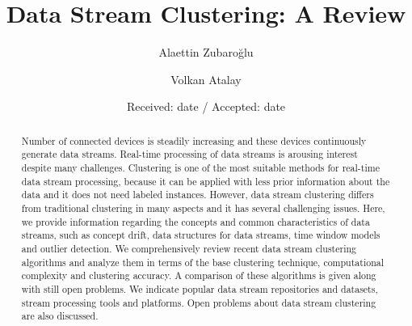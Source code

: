 \documentclass[smallcondensed]{svjour3}     %
\begin{document}
\title{Data Stream Clustering: A Review
}


\author{Alaettin Zubaro\u{g}lu      \and
        Volkan Atalay
}


\date{Received: date / Accepted: date}


\maketitle

\begin{abstract}
Number of connected devices is steadily increasing and these devices continuously generate data streams. Real-time processing of data streams is arousing interest despite many challenges. Clustering is one of the most suitable methods for real-time data stream processing, because it can be applied with less prior information about the data and it does not need labeled instances. However, data stream clustering differs from traditional clustering in many aspects and it has several challenging issues. 
Here, we provide information regarding the concepts and common characteristics of data streams, such as concept drift, data structures for data streams, time window models and outlier detection. We comprehensively review recent data stream clustering algorithms and analyze them in terms of the base clustering technique, computational complexity and clustering accuracy. A comparison of these algorithms is given along with still open problems. We indicate popular data stream repositories and datasets, stream processing tools and platforms. Open problems about data stream clustering are also discussed.
\end{abstract}
\end{document}
